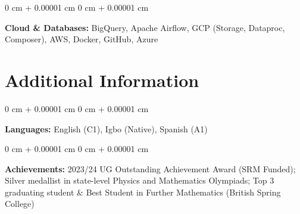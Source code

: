 \documentclass[10pt, a4paper]{article}
\newenvironment{onecolentry}{
    \begin{adjustwidth}{
        0 cm + 0.00001 cm
    }{
        0 cm + 0.00001 cm
    }
}{
    \end{adjustwidth}
} %
\begin{document}
    \begin{onecolentry}
        \textbf{Cloud \& Databases:} BigQuery, Apache Airflow, GCP (Storage, Dataproc, Composer), AWS, Docker, GitHub, Azure
    \end{onecolentry}

    \vspace{0.2 cm}

    \section{Additional Information}

    \begin{onecolentry}
        \textbf{Languages:} English (C1), Igbo (Native), Spanish (A1)
    \end{onecolentry}

    \vspace{0.1 cm}



    \begin{onecolentry}
        \textbf{Achievements:} 2023/24 UG Outstanding Achievement Award (SRM Funded); Silver medallist in state-level Physics and Mathematics Olympiads; Top 3 graduating student \& Best Student in Further Mathematics (British Spring College)
    \end{onecolentry}

    \vspace{0.2 cm}
\end{document}
